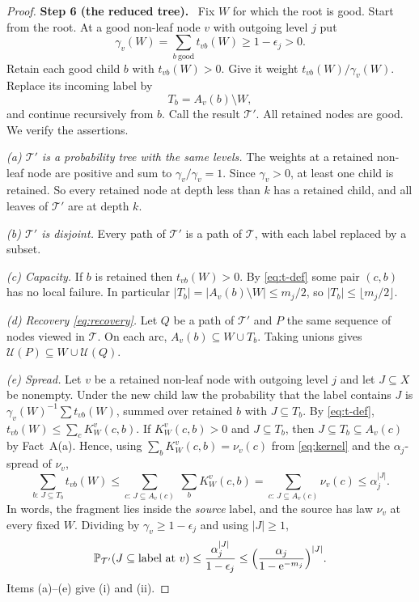 \documentclass[11pt]{article}
\numberwithin{equation}{section}
\newcommand{\PP}{\mathbb P}
\newcommand{\TT}{\mathcal T}
\newcommand{\UU}{\mathcal U}
\newcommand{\ee}{\mathrm e}
\newcommand{\step}[2]{\medskip\noindent\textbf{Step #1 (#2).}\ }
\begin{document}
\begin{proof}
\step{6}{the reduced tree}
Fix $W$ for which the root is good. Start from the root. At a good
non-leaf node $v$ with outgoing level $j$ put
\[
 \gamma_v(W)=\sum_{b\ \mathrm{good}}t_{vb}(W)\ge1-\epsilon_j>0 .
\]
Retain each good child $b$ with $t_{vb}(W)>0$. Give it weight
$t_{vb}(W)/\gamma_v(W)$. Replace its incoming label by
\[
 T_b=A_v(b)\setminus W,
\]
and continue recursively from $b$. Call the result $\TT'$. All
retained nodes are good. We verify the assertions.

\emph{(a) $\TT'$ is a probability tree with the same levels.} The
weights at a retained non-leaf node are positive and sum to
$\gamma_v/\gamma_v=1$. Since $\gamma_v>0$, at least one child is
retained. So every retained node at depth less than $k$ has a retained
child, and all leaves of $\TT'$ are at depth $k$.

\emph{(b) $\TT'$ is disjoint.} Every path of $\TT'$ is a path of
$\TT$, with each label replaced by a subset.

\emph{(c) Capacity.} If $b$ is retained then $t_{vb}(W)>0$. By
\eqref{eq:t-def} some pair $(c,b)$ has no local failure. In particular
$|T_b|=|A_v(b)\setminus W|\le m_j/2$, so
$|T_b|\le\lfloor m_j/2\rfloor$.

\emph{(d) Recovery \eqref{eq:recovery}.} Let $Q$ be a path of $\TT'$
and $P$ the same sequence of nodes viewed in $\TT$. On each arc,
$A_v(b)\subseteq W\cup T_b$. Taking unions gives
$\UU(P)\subseteq W\cup\UU(Q)$.

\emph{(e) Spread.} Let $v$ be a retained non-leaf node with outgoing
level $j$ and let $J\subseteq X$ be nonempty. Under the new child law
the probability that the label contains $J$ is
$\gamma_v(W)^{-1}\sum t_{vb}(W)$, summed over retained $b$ with
$J\subseteq T_b$. By \eqref{eq:t-def},
$t_{vb}(W)\le\sum_cK^v_W(c,b)$. If $K^v_W(c,b)>0$ and
$J\subseteq T_b$, then $J\subseteq T_b\subseteq A_v(c)$ by
Fact~A(a). Hence, using $\sum_bK^v_W(c,b)=\nu_v(c)$ from
\eqref{eq:kernel} and the $\alpha_j$-spread of $\nu_v$,
\[
 \sum_{b:\,J\subseteq T_b}t_{vb}(W)
 \le\sum_{c:\,J\subseteq A_v(c)}\ \sum_{b}K^v_W(c,b)
 =\sum_{c:\,J\subseteq A_v(c)}\nu_v(c)\le\alpha_j^{|J|}.
\]
In words, the fragment lies inside the \emph{source} label, and the
source has law $\nu_v$ at every fixed $W$. Dividing by
$\gamma_v\ge1-\epsilon_j$ and using $|J|\ge1$,
\[
 \PP_{\TT'}(J\subseteq\text{label at }v)
 \le\frac{\alpha_j^{|J|}}{1-\epsilon_j}
 \le\Bigl(\frac{\alpha_j}{1-\ee^{-m_j}}\Bigr)^{|J|}.
\]
Items (a)--(e) give (i) and (ii).
\end{proof}
\end{document}
